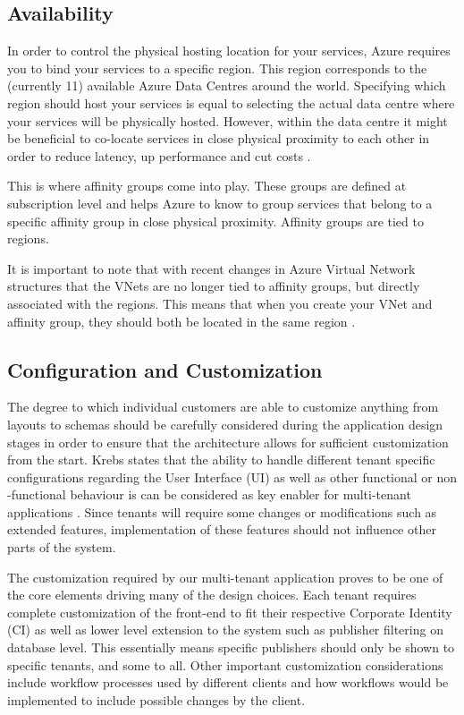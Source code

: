 \subsection{Availability}
\label{sec:availability}
In order to control the physical hosting location for your services, Azure requires you to bind your services to a specific region. This region corresponds to the (currently 11) available Azure Data Centres around the world\cite{Microsoft_Corporation2014-bf}. Specifying which region should host your services is equal to selecting the actual data centre where your services will be physically hosted. However, within the data centre it might be beneficial to co-locate services in close physical proximity to each other in order to reduce latency, up performance and cut costs \cite{Microsoft_Corporation2014-dn}.
 

This is where affinity groups come into play. These groups are defined at subscription level and helps Azure to know to group services that belong to a specific affinity group in close physical proximity. Affinity groups are tied to regions.
 
It is important to note that with recent changes in Azure Virtual Network structures that the VNets are no longer tied to affinity groups, but directly associated with the regions. This means that when you create your VNet and affinity group, they should both be located in the same region \cite{Microsoft_Corporation2014-dn}.

\subsection{Configuration and Customization}
\label{sec:custandconf}

The degree to which individual customers are able to customize anything from layouts to schemas should be carefully considered during the application design stages in order to ensure that the architecture allows for sufficient customization from the start. Krebs states that the ability to handle different tenant specific configurations regarding the User Interface (UI) as well as other functional or non -functional behaviour is can be considered as key enabler for multi-tenant applications \cite{Krebs2012}. Since tenants will require some changes or modifications such as extended features, implementation of these features should not influence other parts of the system.
 
The customization required by our multi-tenant application proves to be one of the core elements driving many of the design choices. Each tenant requires complete customization of the front-end to fit their respective Corporate Identity (CI) as well as lower level extension to the system such as publisher filtering on database level. This essentially means specific publishers should only be shown to specific tenants, and some to all. Other important customization considerations include workflow processes used by different clients and how workflows would be implemented to include possible changes by the client.


